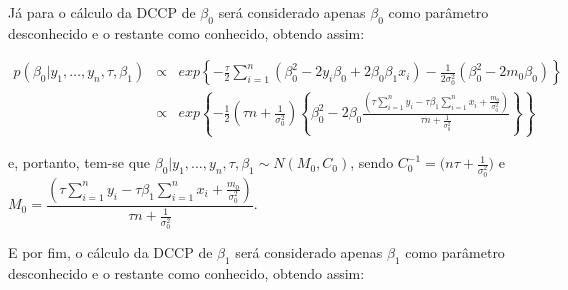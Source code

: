 \documentclass[12pt,a4paper,header]{abnt}
\begin{document}
Já para o cálculo da \ac{DCCP} de $\beta_0$ será considerado apenas $\beta_0$ como parâmetro desconhecido e o restante como conhecido, obtendo assim:

\begin{eqnarray*}
p(\beta_0 | y_1,\ldots,y_n,\tau, \beta_1) &\propto& exp \left\{ -\frac{\tau}{2} \sum^n_{i=1} (\beta_0^2 - 2y_i\beta_0 +2\beta_0\beta_1x_i) - \frac{1}{2\sigma_0^2}(\beta_0^2-2m_0\beta_0)  \right\}
\nonumber \\
&\propto& exp \left\{-\frac{1}{2} (\tau n + \frac{1}{\sigma_0^2}) \left\{
\beta_0^2 -2\beta_0 \frac{(\tau\sum^n_{i=1}y_i - \tau\beta_1\sum^n_{i=1}x_i  +\frac{m_0}{\sigma_0^2})}{ \tau n + \frac{1}{\sigma_0^2}}    \right\}    \right\}
\end{eqnarray*}

e, portanto, tem-se que $\beta_0 | y_1,\ldots,y_n , \tau,\beta_1 \sim N(M_0, C_0)$, sendo $C_0^{-1}= \Big( n\tau +   \frac{1}{\sigma_0^2} \Big)$ e $M_0=\dfrac{(\tau\sum^n_{i=1}y_i - \tau\beta_1\sum^n_{i=1}x_i  +\frac{m_0}{\sigma_0^2})}{ \tau n + \frac{1}{\sigma_0^2}}$.

E por fim, o cálculo da \ac{DCCP} de $\beta_1$ será considerado apenas $\beta_1$ como parâmetro desconhecido e o restante como conhecido, obtendo assim:
\end{document}
